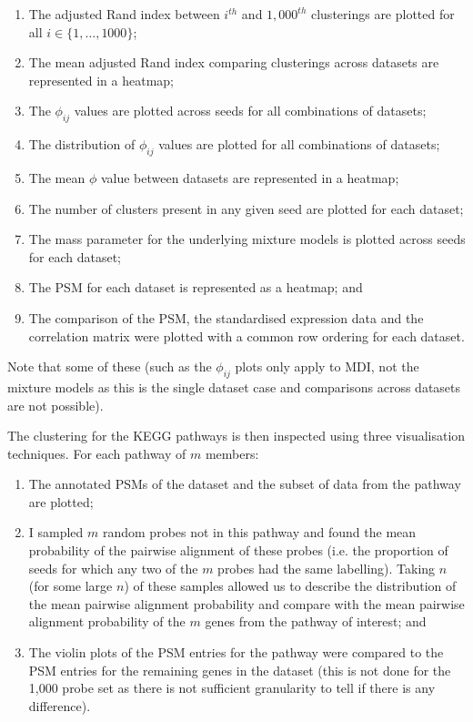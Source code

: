 \documentclass[14pt]{extarticle} %
\begin{document}
	\begin{enumerate} \label{list:cedar_pipeline_analysis}
		\item The adjusted Rand index between $i^{th}$ and $1,000^{th}$ clusterings are plotted for all $i\in \{1,\ldots,1000\}$;
		\item The mean adjusted Rand index comparing clusterings across datasets are represented in a heatmap;
		\item The $\phi_{ij}$ values are plotted across seeds for all combinations of datasets;
		\item The distribution of $\phi_{ij}$ values are plotted for all combinations of datasets;
		\item The mean $\phi$ value between datasets are represented in a heatmap;
		\item The number of clusters present in any given seed are plotted for each dataset;
		\item The mass parameter for the underlying mixture models is plotted across seeds for each dataset;
		\item The PSM for each dataset is represented as a heatmap; and
		\item The comparison of the PSM, the standardised expression data and the correlation matrix were plotted with a common row ordering for each dataset. %
	\end{enumerate}
	Note that some of these (such as the $\phi_{ij}$ plots only apply to MDI, not the mixture models as this is the single dataset case and comparisons across datasets are not possible).
	
	The clustering for the KEGG pathways is then inspected using three visualisation techniques. For each pathway of $m$ members:
	\begin{enumerate}
		\item The annotated PSMs of the dataset and the subset of data from the pathway are plotted;
		\item I sampled $m$ random probes not in this pathway and found the mean probability of the pairwise alignment of these probes (i.e. the proportion of seeds for which any two of the $m$ probes had the same labelling). Taking $n$ (for some large $n$) of these samples allowed us to describe the distribution of the mean pairwise alignment probability and compare with the mean pairwise alignment probability of the $m$ genes from the pathway of interest; and
		\item The violin plots of the PSM entries for the pathway were compared to the PSM entries for the remaining genes in the dataset (this is not done for the 1,000 probe set as there is not sufficient granularity to tell if there is any difference).
	\end{enumerate}
\end{document}
